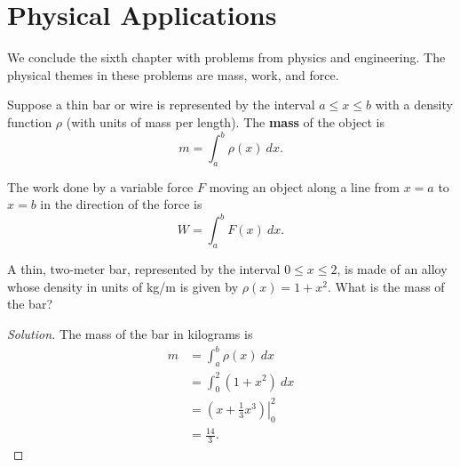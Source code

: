 \documentclass[compacto,10pt,comentarios]{aleph-notas}
\begin{document}
\encabezado

\section*{Physical Applications}
We conclude the sixth chapter with problems from physics and engineering. The physical themes in these problems are mass, work, and force.
\begin{defi}
    Suppose a thin bar or wire is represented by the interval $a \leq x \leq b$ with a density function $\rho$ (with units of mass per length). The \textbf{mass} of the object is
    $$
        m = \int_{a}^{b} \rho(x) ~ dx.
    $$
\end{defi}

\begin{defi}
    The work done by a variable force $F$ moving an object along a line from $x = a$ to $x = b$ in the direction of the force is
    $$
        W = \int_{a}^{b} F(x) ~ dx.
    $$
\end{defi}
\begin{ejer}
    A thin, two-meter bar, represented by the interval $0 \leq x \leq 2$, is made of an alloy whose density in units of kg/m is given by $\rho(x) = 1 + x^2$. What is the mass of the bar?
\end{ejer}
\begin{proof}[Solution]
    The mass of the bar in kilograms is
    \begin{align*}
        m & = \int_{a}^{b} \rho(x) ~ dx \\
        & = \int_{0}^{2} (1 + x^{2}) ~ dx \\
        & = \left. \left( x + \frac{1}{3} x^{3} \right) \right\rvert_{0}^{2} \\
        & = \frac{14}{3}.
    \end{align*}
\end{proof}
\end{document}
